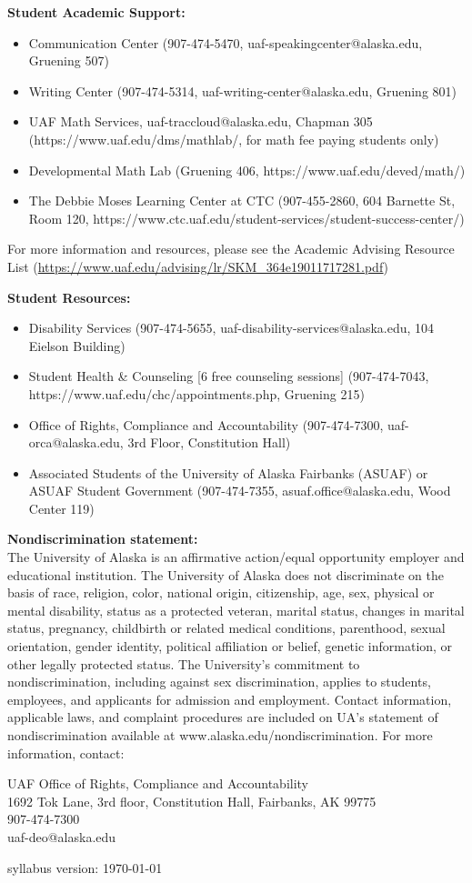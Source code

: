 \documentclass[12pt]{article}
\renewcommand{\emph}[1]{\textsf{\textbf{#1}}}
\newcommand{\localhead}[1]{\par\smallskip\textbf{#1}\nobreak\\}%
\def\subheading#1{\localhead{\emph{#1}}}
\begin{document}
\subheading{Student Academic Support:}
\begin{itemize}
\item Communication Center (907-474-5470, uaf-speakingcenter@alaska.edu, Gruening 507)
\item Writing Center (907-474-5314, uaf-writing-center@alaska.edu, Gruening 801)
\item UAF Math Services, uaf-traccloud@alaska.edu, Chapman 305 (https://www.uaf.edu/dms/mathlab/, for math fee paying students only)
\item Developmental Math Lab (Gruening 406, https://www.uaf.edu/deved/math/)
\item The Debbie Moses Learning Center at CTC (907-455-2860, 604 Barnette St, Room 120, https://www.ctc.uaf.edu/student-services/student-success-center/)
\end{itemize}
For more information and resources, please see the Academic Advising Resource List (\url{https://www.uaf.edu/advising/lr/SKM_364e19011717281.pdf})


\subheading{Student Resources:}
\begin{itemize}
\item Disability Services (907-474-5655, uaf-disability-services@alaska.edu, 104 Eielson Building) 
\item Student Health \& Counseling [6 free counseling sessions] (907-474-7043, https://www.uaf.edu/chc/appointments.php, Gruening 215)
\item Office of Rights, Compliance and Accountability (907-474-7300, uaf-orca@alaska.edu, 3rd Floor, Constitution Hall)
\item Associated Students of the University of Alaska Fairbanks (ASUAF) or ASUAF Student Government (907-474-7355, asuaf.office@alaska.edu, Wood Center 119)
\end{itemize}


\subheading{Nondiscrimination statement:} The University of Alaska is an affirmative action/equal opportunity employer and educational institution. The University of Alaska does not discriminate on the basis of race, religion, color, national origin, citizenship, age, sex, physical or mental disability, status as a protected veteran, marital status, changes in marital status, pregnancy, childbirth or related medical conditions, parenthood, sexual orientation, gender identity, political affiliation or belief, genetic information, or other legally protected status. The University's commitment to nondiscrimination, including against sex discrimination, applies to students, employees, and applicants for admission and employment. Contact information, applicable laws, and complaint procedures are included on UA's statement of nondiscrimination available at www.alaska.edu/nondiscrimination. For more information, contact: 

UAF Office of Rights, Compliance and Accountability\\
1692 Tok Lane, 3rd floor, Constitution Hall, Fairbanks, AK  99775\\
907-474-7300\\
uaf-deo@alaska.edu\\

\hfill

 \scriptsize syllabus version: \today \normalsize
\end{document}
